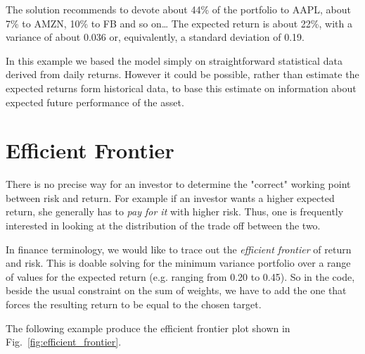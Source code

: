 The solution recommends to devote about 44\% of the portfolio to AAPL,
about 7\% to AMZN, 10\% to FB and so on\ldots 
The expected return is
about 22\%, with a variance of about 0.036 or, equivalently, a standard deviation of 0.19.

In this example we based the model simply on straightforward statistical
data derived from daily returns. However it could be possible, rather
than estimate the expected returns form historical data,
to base this estimate on information about
expected future performance of the asset.

\section{Efficient Frontier}\label{efficient-frontier}

There is no precise way for an investor to determine the "correct"
working point between risk and return. For example if an investor wants
a higher expected return, she generally has to \emph{pay for it} with
higher risk. Thus, one is frequently interested in looking at the
distribution of the trade off between the two. 

In finance terminology, we would like to trace out the \emph{efficient frontier} of return and risk. This is doable solving for the minimum variance portfolio over a range of values for the expected return (e.g. ranging from 0.20 to
0.45).
So in the code, beside the usual constraint on the sum of weights, we have to add the one that forces the resulting return to be equal to the chosen target.

The following example produce the efficient frontier plot shown in Fig.~\ref{fig:efficient_frontier}.


